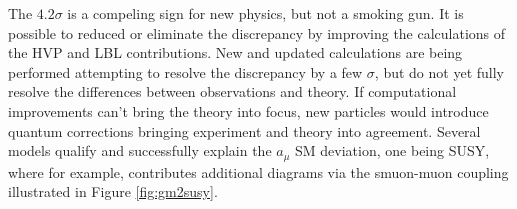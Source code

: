 
The $4.2\sigma$  is a compeling sign for new physics, but not a smoking gun. It is possible to reduced or eliminate the discrepancy by improving the calculations of the HVP and LBL contributions. New and updated calculations are being performed attempting to resolve the discrepancy by a few $\sigma$, but do not yet fully resolve the differences between observations and theory. If computational improvements can't bring the theory into focus, new particles would introduce  quantum corrections bringing experiment and theory into agreement. Several models qualify and successfully explain the $a_\mu$ SM deviation, one being SUSY, where for example, contributes additional diagrams via the smuon-muon coupling illustrated in Figure \ref{fig:gm2susy}.

